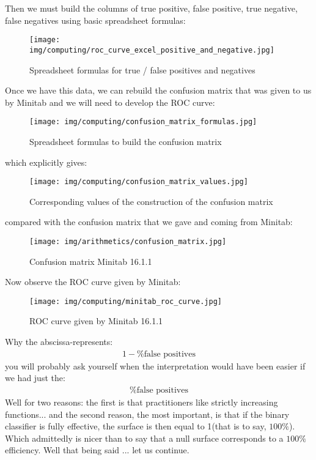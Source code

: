 	Then we must build the columns of true positive, false positive, true negative, false negatives using basic spreadsheet formulas:
	\begin{figure}[H]
		\centering
		\texttt{[image: img/computing/roc\_curve\_excel\_positive\_and\_negative.jpg]}
		\caption{Spreadsheet formulas for true / false positives and negatives}
	\end{figure}
	Once we have this data, we can rebuild the confusion matrix that was given to us by Minitab and we will need to develop the ROC curve:
	\begin{figure}[H]
		\centering
		\texttt{[image: img/computing/confusion\_matrix\_formulas.jpg]}
		\caption{Spreadsheet formulas to build the confusion matrix}
	\end{figure}
	which explicitly gives:
	\begin{figure}[H]
		\centering
		\texttt{[image: img/computing/confusion\_matrix\_values.jpg]}
		\caption{Corresponding values of the construction of the confusion matrix}
	\end{figure}
	compared with the confusion matrix that we gave and coming from Minitab:
	\begin{figure}[H]
		\centering
		\texttt{[image: img/arithmetics/confusion\_matrix.jpg]}
		\caption{Confusion matrix Minitab 16.1.1}
	\end{figure}
	Now observe the ROC curve given by Minitab:
	\begin{figure}[H]
		\centering
		\texttt{[image: img/computing/minitab\_roc\_curve.jpg]}
		\caption{ROC curve given by Minitab 16.1.1}
	\end{figure}
	Why the abscissa-represents:
	\begin{gather*}
		1-\%\text{false positives}
	\end{gather*}
	you will probably ask yourself when the interpretation would have been easier if we had just the:
	\begin{gather*}
		\%\text{false positives}
	\end{gather*}
	Well for two reasons: the first is that practitioners like strictly increasing functions... and the second reason, the most important, is that if the binary classifier is fully effective, the surface is then equal to 1$ $(that is to say, $100\%$). Which admittedly is nicer than to say that a null surface corresponds to a $100\%$ efficiency. Well that being said ... let us continue.
	
